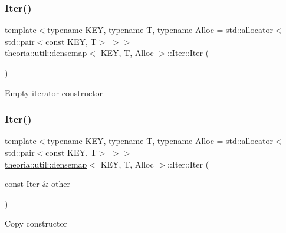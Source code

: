 \subsubsection{\texorpdfstring{Iter()}{Iter()}\hspace{0.1cm}{\footnotesize\ttfamily [1/3]}}
{\footnotesize\ttfamily template$<$typename K\+EY, typename T, typename Alloc = std\+::allocator$<$std\+::pair$<$const K\+E\+Y, T$>$ $>$$>$ \\
\hyperlink{classtheoria_1_1util_1_1densemap}{theoria\+::util\+::densemap}$<$ K\+EY, T, Alloc $>$\+::Iter\+::\+Iter (\begin{DoxyParamCaption}{ }\end{DoxyParamCaption})\hspace{0.3cm}{\ttfamily [inline]}}

Empty iterator constructor \mbox{\label{classtheoria_1_1util_1_1densemap_1_1Iter_a750c06e8ecf8f5200e0bb8685d385e13}} 
\subsubsection{\texorpdfstring{Iter()}{Iter()}\hspace{0.1cm}{\footnotesize\ttfamily [2/3]}}
{\footnotesize\ttfamily template$<$typename K\+EY, typename T, typename Alloc = std\+::allocator$<$std\+::pair$<$const K\+E\+Y, T$>$ $>$$>$ \\
\hyperlink{classtheoria_1_1util_1_1densemap}{theoria\+::util\+::densemap}$<$ K\+EY, T, Alloc $>$\+::Iter\+::\+Iter (\begin{DoxyParamCaption}\item[{const \hyperlink{classtheoria_1_1util_1_1densemap_1_1Iter}{Iter} \&}]{other }\end{DoxyParamCaption})\hspace{0.3cm}{\ttfamily [inline]}}

Copy constructor \mbox{\label{classtheoria_1_1util_1_1densemap_1_1Iter_a796e7241e62ebbfbb3e87db3495e0672}} 
